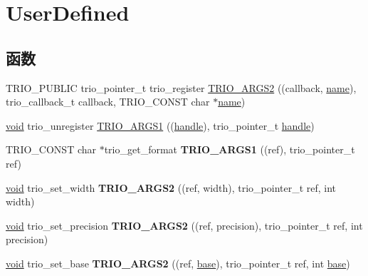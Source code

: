 \hypertarget{group___user_defined}{}\section{User\+Defined}
\label{group___user_defined}
\subsection*{函数}
\begin{DoxyCompactItemize}
\item 
T\+R\+I\+O\+\_\+\+P\+U\+B\+L\+IC trio\+\_\+pointer\+\_\+t trio\+\_\+register \hyperlink{group___user_defined_gae8ec414d5e5232993dd888a92b5c9ced}{T\+R\+I\+O\+\_\+\+A\+R\+G\+S2} ((callback, \hyperlink{structname}{name}), trio\+\_\+callback\+\_\+t callback, T\+R\+I\+O\+\_\+\+C\+O\+N\+ST char $\ast$\hyperlink{structname}{name})
\item 
\hyperlink{interfacevoid}{void} trio\+\_\+unregister \hyperlink{group___user_defined_ga0c0c60dc963d34ebf42d3e82c603d175}{T\+R\+I\+O\+\_\+\+A\+R\+G\+S1} ((\hyperlink{structhandle}{handle}), trio\+\_\+pointer\+\_\+t \hyperlink{structhandle}{handle})
\item 
\mbox{\label{group___user_defined_ga93922747d66afa6899c29a6b364bd72a}} 
T\+R\+I\+O\+\_\+\+C\+O\+N\+ST char $\ast$trio\+\_\+get\+\_\+format {\bfseries T\+R\+I\+O\+\_\+\+A\+R\+G\+S1} ((ref), trio\+\_\+pointer\+\_\+t ref)
\item 
\mbox{\label{group___user_defined_gaf01e035d8484b1ea8d0728f8e67fd6cf}} 
\hyperlink{interfacevoid}{void} trio\+\_\+set\+\_\+width {\bfseries T\+R\+I\+O\+\_\+\+A\+R\+G\+S2} ((ref, width), trio\+\_\+pointer\+\_\+t ref, int width)
\item 
\mbox{\label{group___user_defined_gad4b0bb1b43fc8d462676c3b89fb66442}} 
\hyperlink{interfacevoid}{void} trio\+\_\+set\+\_\+precision {\bfseries T\+R\+I\+O\+\_\+\+A\+R\+G\+S2} ((ref, precision), trio\+\_\+pointer\+\_\+t ref, int precision)
\item 
\mbox{\label{group___user_defined_ga07218280b11c45e5e32a3566c0428ada}} 
\hyperlink{interfacevoid}{void} trio\+\_\+set\+\_\+base {\bfseries T\+R\+I\+O\+\_\+\+A\+R\+G\+S2} ((ref, \hyperlink{structbase}{base}), trio\+\_\+pointer\+\_\+t ref, int \hyperlink{structbase}{base})

\end{DoxyCompactItemize}
